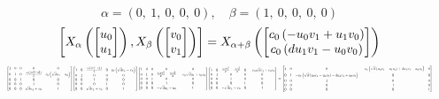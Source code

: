 \documentclass[11pt]{article}
\theoremstyle{definition}
\begin{document}
\[
\alpha = \left( 0, \  1, \  0, \  0, \  0\right), \quad \beta = \left( 1, \  0, \  0, \  0, \  0\right)
\]
\[
\scaletoalign{\textwidth}{\left[ X_{\alpha}\left(\left[\begin{matrix}u_{0}\\u_{1}\end{matrix}\right]\right), X_{\beta}\left(\left[\begin{matrix}v_{0}\\v_{1}\end{matrix}\right]\right) \right] = X_{\alpha + \beta}\left(\left[\begin{matrix}c_{0} \left(- u_{0} v_{1} + u_{1} v_{0}\right)\\c_{0} \left(d u_{1} v_{1} - u_{0} v_{0}\right)\end{matrix}\right]\right)}
\]
\[
\scaletoalign{\textwidth}{{\left[\begin{matrix}1 & 0 & 0 & 0 & 0\\0 & 1 & 0 & \frac{c_{0} \left(d u_{1}^{2} - u_{0}^{2}\right)}{2} & c_{0} \left(\sqrt{d} u_{1} - u_{0}\right)\\0 & 0 & 1 & 0 & 0\\0 & 0 & 0 & 1 & 0\\0 & 0 & 0 & \sqrt{d} u_{1} + u_{0} & 1\end{matrix}\right]} {\left[\begin{matrix}1 & 0 & \frac{c_{0} \left(d v_{1}^{2} - v_{0}^{2}\right)}{2} & 0 & c_{0} \left(\sqrt{d} v_{1} - v_{0}\right)\\0 & 1 & 0 & 0 & 0\\0 & 0 & 1 & 0 & 0\\0 & 0 & 0 & 1 & 0\\0 & 0 & \sqrt{d} v_{1} + v_{0} & 0 & 1\end{matrix}\right]} {\left[\begin{matrix}1 & 0 & 0 & 0 & 0\\0 & 1 & 0 & \frac{c_{0} d u_{1}^{2}}{2} - \frac{c_{0} u_{0}^{2}}{2} & - c_{0} \sqrt{d} u_{1} + c_{0} u_{0}\\0 & 0 & 1 & 0 & 0\\0 & 0 & 0 & 1 & 0\\0 & 0 & 0 & - \sqrt{d} u_{1} - u_{0} & 1\end{matrix}\right]} {\left[\begin{matrix}1 & 0 & \frac{c_{0} d v_{1}^{2}}{2} - \frac{c_{0} v_{0}^{2}}{2} & 0 & - c_{0} \sqrt{d} v_{1} + c_{0} v_{0}\\0 & 1 & 0 & 0 & 0\\0 & 0 & 1 & 0 & 0\\0 & 0 & 0 & 1 & 0\\0 & 0 & - \sqrt{d} v_{1} - v_{0} & 0 & 1\end{matrix}\right]} = {\left[\begin{matrix}1 & 0 & 0 & - c_{0} \left(\sqrt{d} \left(u_{0} v_{1} - u_{1} v_{0}\right) + d u_{1} v_{1} - u_{0} v_{0}\right) & 0\\0 & 1 & - c_{0} \left(\sqrt{d} \left(u_{0} v_{1} - u_{1} v_{0}\right) - d u_{1} v_{1} + u_{0} v_{0}\right) & 0 & 0\\0 & 0 & 1 & 0 & 0\\0 & 0 & 0 & 1 & 0\\0 & 0 & 0 & 0 & 1\end{matrix}\right]}}
\]
\end{document}
